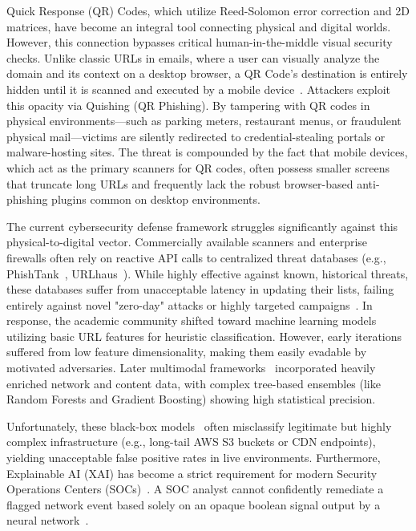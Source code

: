 \documentclass[10pt,twocolumn,letterpaper]{article}
\begin{document}
Quick Response (QR) Codes, which utilize Reed-Solomon error correction and 2D matrices, have become an integral tool connecting physical and digital worlds. However, this connection bypasses critical human-in-the-middle visual security checks. Unlike classic URLs in emails, where a user can visually analyze the domain and its context on a desktop browser, a QR Code's destination is entirely hidden until it is scanned and executed by a mobile device~\cite{Krombholz2014}. Attackers exploit this opacity via Quishing (QR Phishing). By tampering with QR codes in physical environments---such as parking meters, restaurant menus, or fraudulent physical mail---victims are silently redirected to credential-stealing portals or malware-hosting sites. The threat is compounded by the fact that mobile devices, which act as the primary scanners for QR codes, often possess smaller screens that truncate long URLs and frequently lack the robust browser-based anti-phishing plugins common on desktop environments.

The current cybersecurity defense framework struggles significantly against this physical-to-digital vector. Commercially available scanners and enterprise firewalls often rely on reactive API calls to centralized threat databases (e.g., PhishTank~\cite{PhishTank}, URLhaus~\cite{abusech}). While highly effective against known, historical threats, these databases suffer from unacceptable latency in updating their lists, failing entirely against novel "zero-day" attacks or highly targeted campaigns~\cite{Ma2009}. In response, the academic community shifted toward machine learning models~\cite{Mohammad2014, Jain2019} utilizing basic URL features for heuristic classification. However, early iterations suffered from low feature dimensionality, making them easily evadable by motivated adversaries. Later multimodal frameworks~\cite{Sahingoz2019, Hannousse2021, AlSharafi2022} incorporated heavily enriched network and content data, with complex tree-based ensembles (like Random Forests and Gradient Boosting) showing high statistical precision.

Unfortunately, these black-box models~\cite{Kenny2021} often misclassify legitimate but highly complex infrastructure (e.g., long-tail AWS S3 buckets or CDN endpoints), yielding unacceptable false positive rates in live environments. Furthermore, Explainable AI (XAI) has become a strict requirement for modern Security Operations Centers (SOCs)~\cite{AlZoubi2023}. A SOC analyst cannot confidently remediate a flagged network event based solely on an opaque boolean signal output by a neural network~\cite{Garera2007}.
\end{document}
